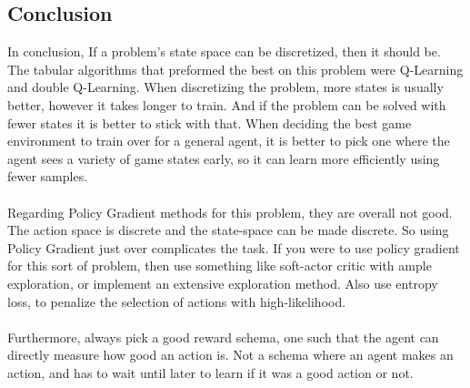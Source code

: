\documentclass[twoside,11pt]{article}
\begin{document}
\subsection{Conclusion}
In conclusion, If a problem's state space can be discretized, then it should be. The tabular algorithms that preformed the best on this problem were Q-Learning and double Q-Learning. When discretizing the problem, more states is usually better, however it takes longer to train. And if the problem can be solved with fewer states it is better to stick with that.
When deciding the best game environment to train over for a general agent, it is better to pick one where the agent sees a variety of game states early, so it can learn more efficiently using fewer samples.\\\\
Regarding Policy Gradient methods for this problem, they are overall not good. The action space is discrete and the state-space can be made discrete. So using Policy Gradient just over complicates the task. If you were to use policy gradient for this sort of problem, then use something like soft-actor critic with ample exploration, or implement an extensive exploration method. Also use entropy loss, to penalize the selection of actions with high-likelihood.  \\\\
Furthermore, always pick a good reward schema, one such that the agent can directly measure how good an action is. Not a schema where an agent makes an action, and has to wait until later to learn if it was a good action or not.

\end{document}
